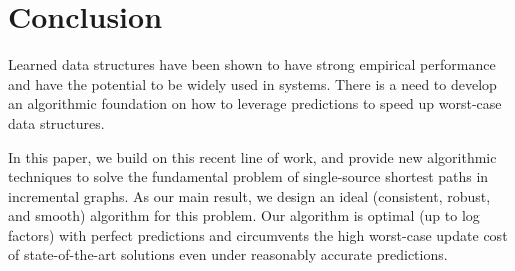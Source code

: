 \section{Conclusion}

Learned data structures have been shown to have strong empirical performance and have the potential to be widely used in systems.  There is a need to develop an algorithmic foundation on how to leverage predictions to speed up worst-case data structures.  

In this paper, we build on this recent line of work, and provide new algorithmic techniques to solve the fundamental problem of
single-source shortest paths in incremental graphs.  As our main result, we design an ideal (consistent, robust, and smooth) algorithm for this problem.  
Our algorithm is optimal (up to log factors) with perfect predictions and circumvents the high worst-case update cost of state-of-the-art solutions even under reasonably accurate predictions. 